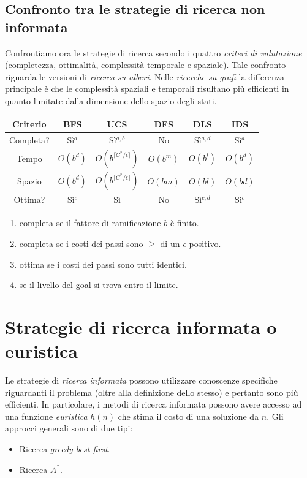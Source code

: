\documentclass[11pt,oneside]{book}
\begin{document}
\subsection{Confronto tra le strategie di ricerca non informata}
Confrontiamo ora le strategie di ricerca secondo i quattro \textit{criteri di valutazione} (completezza, ottimalità, complessità temporale e spaziale). Tale confronto riguarda le versioni di \textit{ricerca su alberi}. Nelle \textit{ricerche su grafi} la differenza principale è che le complessità spaziali e temporali risultano più efficienti in quanto limitate dalla dimensione dello spazio degli stati.
\begin{center}
	\begin{tabular}{cccccc}
		\toprule
		\textbf{Criterio} & \textbf{BFS} & \textbf{UCS} & \textbf{DFS} & \textbf{DLS} & \textbf{IDS} \\
		
		\midrule
		Completa? & Sì$^a$ & Sì$^{a,b}$ & No & Sì$^{a,d}$ & Sì$^a$ \\
		
		Tempo & $O(b^d)$ & $O(b^{\lceil C^\ast / \epsilon \rceil})$ & $O(b^m)$ & $O(b^l)$ & $O(b^d)$ \\
		
		Spazio & $O(b^d)$ & $O(b^{\lceil C^\ast / \epsilon \rceil})$ & $O(bm)$ & $O(bl)$ & $O(bd)$ \\
		
		Ottima? & Sì$^c$ & Sì & No & Sì$^{c,d}$ & Sì$^c$ \\
		
		\bottomrule
	\end{tabular}
\end{center}
\begin{enumerate}[label=$^{\alph*}$]
	\item completa se il fattore di ramificazione $b$ è finito.
	\item completa se i costi dei passi sono $\geq$ di un $\epsilon$ positivo.
	\item ottima se i costi dei passi sono tutti identici.
	\item se il livello del goal si trova entro il limite.
\end{enumerate}


\newpage
\section{Strategie di ricerca informata o euristica}
Le strategie di \textit{ricerca informata} possono utilizzare conoscenze specifiche riguardanti il problema (oltre alla definizione dello stesso) e pertanto sono più efficienti. In particolare, i metodi di ricerca informata possono avere accesso ad una funzione \textit{euristica} $h(n)$ che stima il costo di una soluzione da $n$. Gli approcci generali sono di due tipi:
\begin{itemize}
	\item Ricerca \textit{greedy best-first}.
	\item Ricerca $A^\ast$.
\end{itemize}
\end{document}
